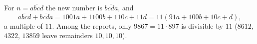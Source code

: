 For $n=\overline{abcd}$ the new number is $\overline{bcda}$, and
\[\overline{abcd}+\overline{bcda}=1001a+1100b+110c+11d=11(91a+100b+10c+d),\]
a multiple of $11$. Among the reports, only $9867=11\cdot897$ is divisible by $11$ ($8612$, $4322$, $13859$ leave remainders $10,10,10$).
